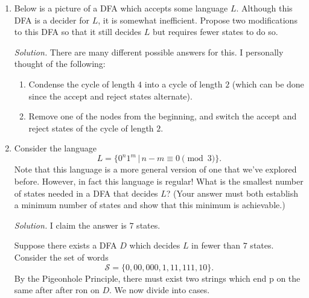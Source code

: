 \documentclass[11pt]{article}
\newcounter{enum}
\newcommand{\solution}
{
\vspace{5pt}
\noindent\textit{Solution.}\qquad
}
\begin{document}
\begin{enumerate}

\item Below is a picture of a DFA which accepts some language $L$.  Although this DFA is a decider for $L$, it is somewhat inefficient.  Propose two modifications to this DFA so that it still decides $L$ but requires fewer states to do so.

\begin{center}
\end{center}

\solution There are many different possible answers for this.  I personally thought of the following:

\begin{enumerate}

\item Condense the cycle of length $4$ into a cycle of length $2$ (which can be done since the accept and reject states alternate).

\item Remove one of the nodes from the beginning, and switch the accept and reject states of the cycle of length $2$.

\end{enumerate}

\item Consider the language \[L=\{0^n1^m\,|\,n-m\equiv 0\pmod 3\}.\] Note that this language is a more general version of one that we've explored before.  However, in fact this language is regular!  What is the smallest number of states needed in a DFA that decides $L$? (Your answer must both establish a minimum number of states and show that this minimum is achievable.)

\solution I claim the answer is $7$ states.

\par Suppose there exists a DFA $D$ which decides $L$ in fewer than $7$ states.  Consider the set of words \[\mathcal{S}=\{0,00,000,1,11,111,10\}.\] By the Pigeonhole Principle, there must exist two strings which end p on the same after after ron on $D$.  We now divide into cases.


\end{enumerate}
\end{document}
